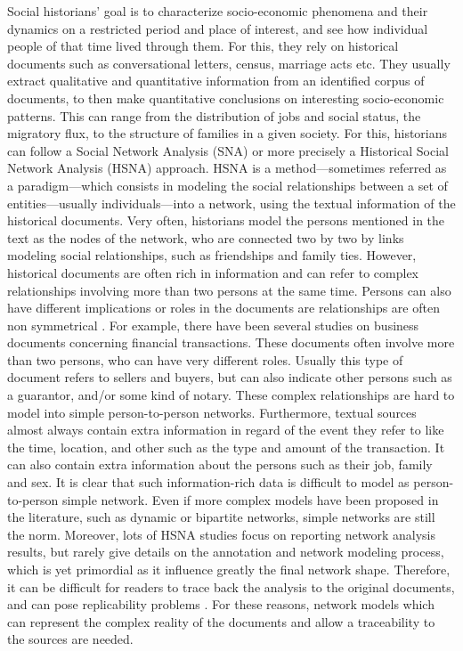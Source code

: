 \documentclass{vgtc}                          %
\begin{document}
Social historians' goal is to characterize socio-economic phenomena and their dynamics on a restricted period and place of interest, and see how individual people of that time lived through them. For this, they rely on historical documents such as conversational letters, census, marriage acts etc. They usually extract qualitative and quantitative information from an identified corpus of documents, to then make quantitative conclusions on interesting socio-economic patterns. This can range from the distribution of jobs and social status, the migratory flux, to the structure of families in a given society. For this, historians can follow a Social Network Analysis (SNA) or more precisely a Historical Social Network Analysis (HSNA) approach. HSNA is a method---sometimes referred as a paradigm---which consists in modeling the social relationships between a set of entities---usually individuals---into a network, using the textual information of the historical documents.
Very often, historians model the persons mentioned in the text as the nodes of the network, who are connected two by two by links modeling social relationships, such as friendships and family ties.
However, historical documents are often rich in information and can refer to complex relationships involving more than two persons at the same time. Persons can also have different implications or roles in the documents are relationships are often non symmetrical \cite{lemercier_analyse_2005}.
For example, there have been several studies on business documents concerning financial transactions. These documents often involve more than two persons, who can have very different roles. Usually this type of document refers to sellers and buyers, but can also indicate other persons such as a guarantor, and/or some kind of notary. These complex relationships are hard to model into simple person-to-person networks.
Furthermore, textual sources almost always contain extra information in regard of the event they refer to like the time, location, and other such as the type and amount of the transaction. It can also contain extra information about the persons such as their job, family and sex.
It is clear that such information-rich data is difficult to model as person-to-person simple network. Even if more complex models have been proposed in the literature, such as dynamic or bipartite networks, simple networks are still the norm.
Moreover, lots of HSNA studies focus on reporting network analysis results, but rarely give details on the annotation and network modeling process, which is yet primordial as it influence greatly the final network shape. Therefore, it can be difficult for readers to trace back the analysis to the original documents, and can pose replicability problems \cite{baker_1500_2016}. For these reasons, network models which can represent the complex reality of the documents and allow a traceability to the sources are needed.  
\end{document}
